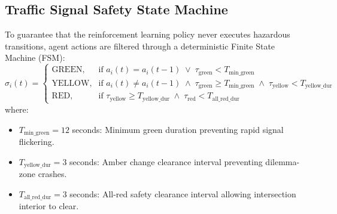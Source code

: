 \subsection{Traffic Signal Safety State Machine}
To guarantee that the reinforcement learning policy never executes hazardous transitions, agent actions are filtered through a deterministic Finite State Machine (FSM):
\begin{equation}
\sigma_i(t) = 
\begin{cases}
\text{GREEN}, & \text{if } a_i(t) = a_i(t-1) \;\lor\; \tau_{\text{green}} < T_{\text{min\_green}} \\
\text{YELLOW}, & \text{if } a_i(t) \ne a_i(t-1) \;\land\; \tau_{\text{green}} \ge T_{\text{min\_green}} \;\land\; \tau_{\text{yellow}} < T_{\text{yellow\_dur}} \\
\text{RED}, & \text{if } \tau_{\text{yellow}} \ge T_{\text{yellow\_dur}} \;\land\; \tau_{\text{red}} < T_{\text{all\_red\_dur}}
\end{cases}
\end{equation}
where:
\begin{itemize}
    \item $T_{\text{min\_green}} = 12$ seconds: Minimum green duration preventing rapid signal flickering.
    \item $T_{\text{yellow\_dur}} = 3$ seconds: Amber change clearance interval preventing dilemma-zone crashes.
    \item $T_{\text{all\_red\_dur}} = 3$ seconds: All-red safety clearance interval allowing intersection interior to clear.
\end{itemize}

